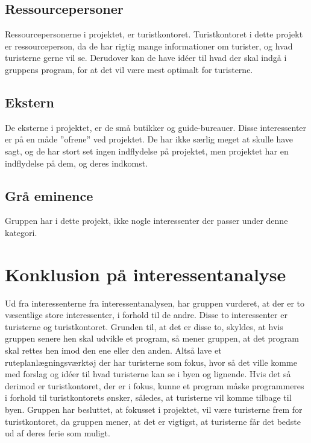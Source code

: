\subsection{Ressourcepersoner}
Ressourcepersonerne i projektet, er turistkontoret.
Turistkontoret i dette projekt er ressourceperson, da de har rigtig mange informationer om turister, og hvad turisterne gerne vil se. Derudover kan de have idéer til hvad der skal indgå i gruppens program, for at det vil være mest optimalt for turisterne.   

\subsection{Ekstern}
De eksterne i projektet, er de små butikker og guide-bureauer.
Disse interessenter er på en måde ”ofrene” ved projektet. De har ikke særlig meget at skulle have sagt, og de har stort set ingen indflydelse på projektet, men projektet har en indflydelse på dem, og deres indkomst. 

\subsection{Grå eminence}
Gruppen har i dette projekt, ikke nogle interessenter der passer under denne kategori.


\section{Konklusion på interessentanalyse}

Ud fra interessenterne fra interessentanalysen, har gruppen vurderet, at der er to væsentlige store interessenter, i forhold til de andre. Disse to interessenter er turisterne og turistkontoret. 
Grunden til, at det er disse to, skyldes, at hvis gruppen senere hen skal udvikle et program, så mener gruppen, at det program skal rettes hen imod den ene eller den anden. Altså lave et ruteplanlægningsværktøj der har turisterne som fokus, hvor så det ville komme med forslag og idéer til hvad turisterne kan se i byen og lignende. Hvis det så derimod er turistkontoret, der er i fokus, kunne et program måske programmeres i forhold til turistkontorets ønsker, således, at turisterne vil komme tilbage til byen. 
Gruppen har besluttet, at fokusset i projektet, vil være turisterne frem for turistkontoret, da gruppen mener, at det er vigtigst, at turisterne får det bedste ud af deres ferie som muligt. 



